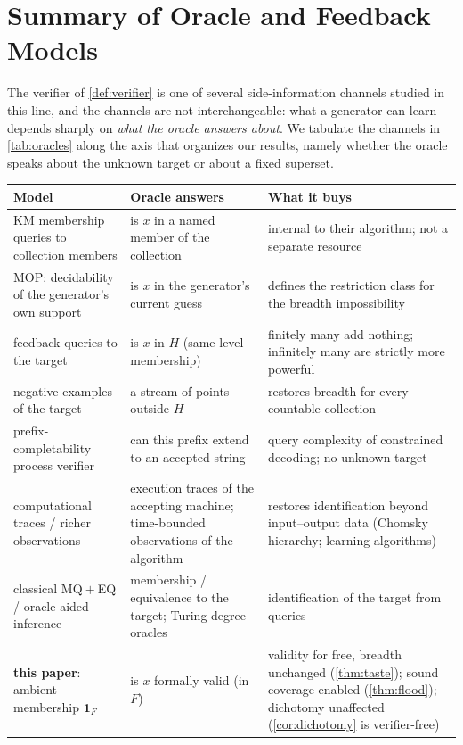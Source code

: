 \documentclass[11pt]{article}
\numberwithin{equation}{section}
\newcommand{\Amb}{F}
\newcommand{\Val}{H}
\theoremstyle{plain}
\theoremstyle{definition}
\theoremstyle{remark}
\begin{document}
\newpage
\section{Summary of Oracle and Feedback Models}
\label{app:oracles}

The verifier of \cref{def:verifier} is one of several side-information channels studied in
this line, and the channels are not interchangeable: what a generator can learn depends
sharply on \emph{what the oracle answers about}. We tabulate the channels in
\cref{tab:oracles} along the axis that organizes our results, namely whether the oracle speaks
about the unknown target or about a fixed superset.

\renewcommand{\arraystretch}{1.25}
\begin{center}
\centering
{}
\label{tab:oracles}
\begin{tabular}{@{}p{}p{}p{}@{}}
\toprule
Model & Oracle answers & What it buys \\
\midrule
KM membership queries to collection members \citep{kleinberg2024language}
  & is $x$ in a named member of the collection
  & internal to their algorithm; not a separate resource \\
MOP: decidability of the generator's own support \citep{kalavasis2025limits}
  & is $x$ in the generator's current guess
  & defines the restriction class for the breadth impossibility \\
feedback queries to the target \citep{charikar2025facets,bai2026noise}
  & is $x$ in $\Val$ (same-level membership)
  & finitely many add nothing; infinitely many are strictly more powerful \\
negative examples of the target \citep{kalavasis2025limits}
  & a stream of points outside $\Val$
  & restores breadth for every countable collection \\
prefix-completability process verifier \citep{botta2025verifier}
  & can this prefix extend to an accepted string
  & query complexity of constrained decoding; no unknown target \\
computational traces / richer observations \citep{psv26,pf25}
  & execution traces of the accepting machine; time-bounded observations of the algorithm
  & restores identification beyond input--output data (Chomsky hierarchy; learning algorithms) \\
classical MQ${}+{}$EQ / oracle-aided inference \citep{angluin1987learning,angluin1988queries,gasarch1989learning,stephan1998learning}
  & membership / equivalence to the target; Turing-degree oracles
  & identification of the target from queries \\
\textbf{this paper}: ambient membership $\mathbf 1_{\Amb}$
  & is $x$ formally valid (in $\Amb$)
  & validity for free, breadth unchanged (\cref{thm:taste}); sound coverage enabled (\cref{thm:flood}); dichotomy unaffected (\cref{cor:dichotomy} is verifier-free) \\
\bottomrule
\end{tabular}
\end{center}
\end{document}
